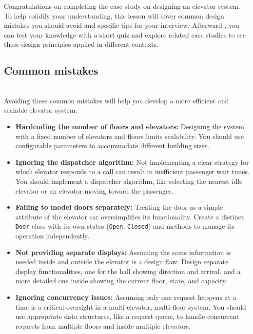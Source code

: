 

Congratulations on completing the case study on designing an elevator system. To help solidify your understanding, this lesson will cover common design mistakes you should avoid and specific tips for your interview. Afterward , you can test your knowledge with a short quiz and explore related case studies to see these design principles applied in different contexts.

\subsection{Common mistakes}\label{Dpo0jLsNagCPsaDyZPyTG}
\\
Avoiding these common mistakes will help you develop a more efficient and scalable elevator system:

\begin{itemize}
\item
\protect{}\label{OOuI-Jf82YeuJBt8tzZ9b}
\textbf{Hardcoding the number of floors and elevators:} Designing the system with a fixed number of elevators and floors limits scalability. You should use configurable parameters to accommodate different building sizes.
\item
\protect{}\label{4hy7cglQKZQA2u2HHQszt}
\textbf{Ignoring the dispatcher algorithm:} Not implementing a clear strategy for which elevator responds to a call can result in inefficient passenger wait times. You should implement a dispatcher algorithm, like selecting the nearest idle elevator or an elevator moving toward the passenger.
\item
\protect{}\label{ryr803A6_aavo5FF9jCxV}
\textbf{Failing to model doors separately:} Treating the door as a simple attribute of the elevator car oversimplifies its functionality. Create a distinct \texttt{Door} class with its own states (\texttt{Open}, \texttt{Closed}) and methods to manage its operation independently.
\item
\protect{}\label{QjwhvSO2Rq0ITqFxryVXI}
\textbf{Not providing separate displays:} Assuming the same information is needed inside and outside the elevator is a design flaw. Design separate display functionalities, one for the hall showing direction and arrival, and a more detailed one inside showing the current floor, state, and capacity.
\item
\protect{}\label{PNtKSNBlwLw5AOvQsha9t}
\textbf{Ignoring concurrency issues:} Assuming only one request happens at a time is a critical oversight in a multi-elevator, multi-floor system. You should use appropriate data structures, like a request queue, to handle concurrent requests from multiple floors and inside multiple elevators.
\end{itemize}

